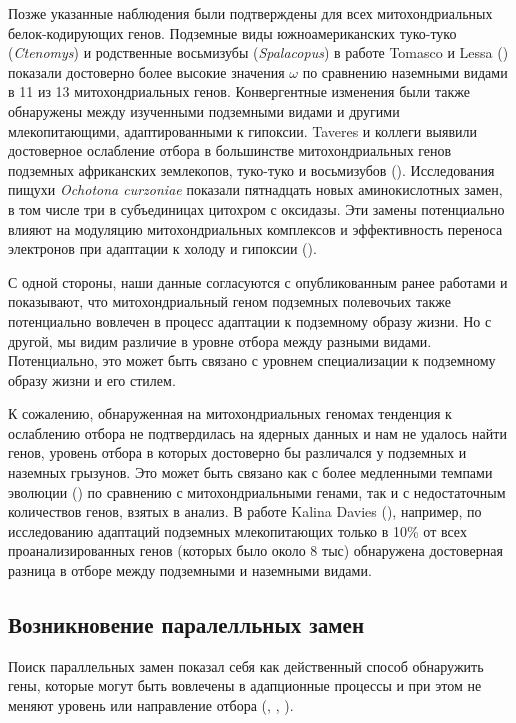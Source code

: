 Позже указанные наблюдения были подтверждены для всех митохондриальных белок-кодирующих генов. Подземные виды южноамериканских туко-туко (\textit{Ctenomys}) и родственные восьмизубы (\textit{Spalacopus}) в работе Tomasco и Lessa (\cite{Tomasco2011}) показали достоверно более высокие значения $\omega$ по сравнению наземными видами в 11 из 13 митохондриальных генов. Конвергентные изменения были также обнаружены между изученными подземными видами и другими млекопитающими, адаптированными к гипоксии. Taveres и коллеги выявили достоверное ослабление отбора в большинстве митохондриальных генов подземных африканских землекопов, туко-туко и восьмизубов (\cite{Tavares2018}). Исследования пищухи \textit{Ochotona curzoniae} показали пятнадцать новых аминокислотных замен, в том числе три в субъединицах цитохром с оксидазы. Эти замены потенциально влияют на модуляцию митохондриальных комплексов и эффективность переноса электронов при адаптации к холоду и гипоксии (\cite{Luo2008}).

 
С одной стороны, наши данные согласуются с опубликованным ранее работами и показывают, что митохондриальный геном подземных полевочьих также потенциально вовлечен в процесс адаптации к подземному образу жизни. Но с другой, мы видим различие в уровне отбора между разными видами. Потенциально, это может быть связано с уровнем специализации к подземному образу жизни и его стилем.

 
К сожалению, обнаруженная на митохондриальных геномах тенденция к ослаблению отбора не подтвердилась на ядерных данных и нам не удалось найти генов, уровень отбора в которых достоверно бы различался у подземных и наземных грызунов. Это может быть связано как с более медленными темпами эволюции (\cite{Lin2004}) по сравнению с митохондриальными генами, так и с недостаточным количествов генов, взятых в анализ. В работе Kalina Davies (\cite{Davies2018}), например, по исследованию адаптаций подземных млекопитающих только в 10\% от всех проанализированных генов (которых было около 8 тыс) обнаружена достоверная разница в отборе между подземными и наземными видами.    


\subsection{Возникновение паралелльных замен}

Поиск параллельных замен показал себя как действенный способ обнаружить гены, которые могут быть вовлечены в адапционные процессы и при этом не меняют уровень или направление отбора (\cite{Davies2018}, \cite{Zhou2015}, \cite{Sackman2017}). 

